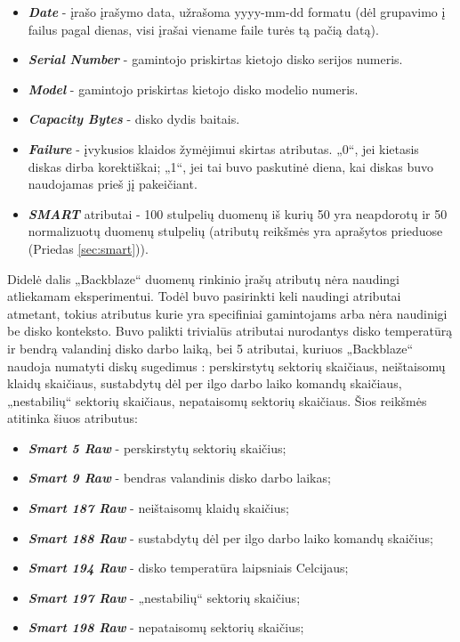 \documentclass{VUMIFPSkursinis}
\begin{document}
\begin{itemize}
\item \textit{\textbf{Date}} - įrašo įrašymo data, užrašoma yyyy-mm-dd formatu (dėl grupavimo į failus pagal dienas, visi įrašai viename faile turės tą pačią datą).
\item \textit{\textbf{Serial Number}} - gamintojo priskirtas kietojo disko serijos numeris.
\item \textit{\textbf{Model}} - gamintojo priskirtas kietojo disko modelio numeris.
\item \textit{\textbf{Capacity Bytes}} - disko dydis baitais.
\item \textit{\textbf{Failure}} - įvykusios klaidos žymėjimui skirtas atributas. „0“, jei kietasis diskas dirba korektiškai; „1“, jei tai buvo paskutinė diena, kai diskas buvo naudojamas prieš jį pakeičiant.
\item \textit{\textbf{SMART}} atributai - 100 stulpelių duomenų iš kurių 50 yra neapdorotų ir 50 normalizuotų duomenų stulpelių (atributų reikšmės yra aprašytos prieduose (Priedas \ref{sec:smart})).
\end{itemize}

Didelė dalis „Backblaze“ duomenų rinkinio įrašų atributų nėra naudingi atliekamam eksperimentui. Todėl buvo pasirinkti keli naudingi atributai atmetant, tokius atributus kurie yra specifiniai gamintojams arba nėra naudinigi be disko konteksto. Buvo palikti trivialūs atributai nurodantys disko temperatūrą ir bendrą valandinį disko darbo laiką, bei 5 atributai, kuriuos „Backblaze“ naudoja numatyti diskų sugedimus \cite{backblaze_failure}: perskirstytų sektorių skaičiaus, neištaisomų klaidų skaičiaus, sustabdytų dėl per ilgo darbo laiko komandų skaičiaus, „nestabilių“ sektorių skaičiaus, nepataisomų sektorių skaičiaus. Šios reikšmės atitinka šiuos atributus:
\begin{itemize}
\item \textit{\textbf{Smart 5 Raw}} - perskirstytų sektorių skaičius;
\item \textit{\textbf{Smart 9 Raw}} - bendras valandinis disko darbo laikas;
\item \textit{\textbf{Smart 187 Raw}} - neištaisomų klaidų skaičius;
\item \textit{\textbf{Smart 188 Raw}} - sustabdytų dėl per ilgo darbo laiko komandų skaičius;
\item \textit{\textbf{Smart 194 Raw}} - disko temperatūra laipsniais Celcijaus;
\item \textit{\textbf{Smart 197 Raw}} - „nestabilių“ sektorių skaičius;
\item \textit{\textbf{Smart 198 Raw}} - nepataisomų sektorių skaičius;
\end{itemize}
\end{document}
